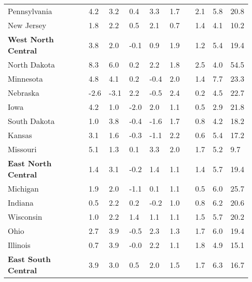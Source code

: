 {\begin{tabular}{p{30mm} R{7mm} R{7mm} R{7mm} R{7mm} 
             R{7mm} p{0mm} R{9mm} R{9mm} R{10mm} }
\hspace{3mm}  Pennsylvania  & 4.2 & 3.2 & 0.4 & 3.3 & 1.7 &  & 2.1 & 5.8 & 20.8 \\
\hspace{3mm}  New Jersey  & 1.8 & 2.2 & 0.5 & 2.1 & 0.7 &  & 1.4 & 4.1 & 10.2 \\
\hspace{1mm} \textbf{West North Central}  & 3.8 & 2.0 & -0.1 & 0.9 & 1.9 &  & 1.2 & 5.4 & 19.4 \\
\hspace{3mm}  North Dakota  & 8.3 & 6.0 & 0.2 & 2.2 & 1.8 &  & 2.5 & 4.0 & 54.5 \\
\hspace{3mm}  Minnesota  & 4.8 & 4.1 & 0.2 & -0.4 & 2.0 &  & 1.4 & 7.7 & 23.3 \\
\hspace{3mm}  Nebraska  & -2.6 & -3.1 & 2.2 & -0.5 & 2.4 &  & 0.2 & 4.5 & 22.7 \\
\hspace{3mm}  Iowa  & 4.2 & 1.0 & -2.0 & 2.0 & 1.1 &  & 0.5 & 2.9 & 21.8 \\
\hspace{3mm}  South Dakota  & 1.0 & 3.8 & -0.4 & -1.6 & 1.7 &  & 0.8 & 4.2 & 18.2 \\
\hspace{3mm}  Kansas  & 3.1 & 1.6 & -0.3 & -1.1 & 2.2 &  & 0.6 & 5.4 & 17.2 \\
\hspace{3mm}  Missouri  & 5.1 & 1.3 & 0.1 & 3.3 & 2.0 &  & 1.7 & 5.2 & 9.7 \\
\hspace{1mm} \textbf{East North Central}  & 1.4 & 3.1 & -0.2 & 1.4 & 1.1 &  & 1.4 & 5.7 & 19.4 \\
\hspace{3mm}  Michigan  & 1.9 & 2.0 & -1.1 & 0.1 & 1.1 &  & 0.5 & 6.0 & 25.7 \\
\hspace{3mm}  Indiana  & 0.5 & 2.2 & 0.2 & -0.2 & 1.0 &  & 0.8 & 6.2 & 20.6 \\
\hspace{3mm}  Wisconsin  & 1.0 & 2.2 & 1.4 & 1.1 & 1.1 &  & 1.5 & 5.7 & 20.2 \\
\hspace{3mm}  Ohio  & 2.7 & 3.9 & -0.5 & 2.3 & 1.3 &  & 1.7 & 6.0 & 19.4 \\
\hspace{3mm}  Illinois  & 0.7 & 3.9 & -0.0 & 2.2 & 1.1 &  & 1.8 & 4.9 & 15.1 \\
\hspace{1mm} \textbf{East South Central}  & 3.9 & 3.0 & 0.5 & 2.0 & 1.5 &  & 1.7 & 6.3 & 16.7 \\

\end{tabular}}
